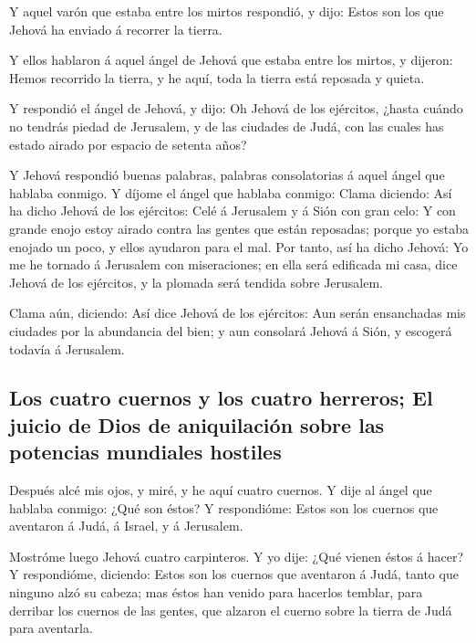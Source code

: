  Y aquel varón que estaba entre los mirtos respondió, y
dijo: Estos son los que Jehová ha enviado á recorrer la tierra.

 Y ellos hablaron á aquel ángel de Jehová que estaba entre
los mirtos, y dijeron: Hemos recorrido la tierra, y he aquí, toda la
tierra está reposada y quieta.

 Y respondió el ángel de Jehová, y dijo: Oh Jehová de los
ejércitos, ¿hasta cuándo no tendrás piedad de Jerusalem, y de las
ciudades de Judá, con las cuales has estado airado por espacio de
setenta años?

 Y Jehová respondió buenas palabras, palabras consolatorias
á aquel ángel que hablaba conmigo.  Y díjome el ángel que
hablaba conmigo: Clama diciendo: Así ha dicho Jehová de los ejércitos:
Celé á Jerusalem y á Sión con gran celo:  Y con grande
enojo estoy airado contra las gentes que están reposadas; porque yo
estaba enojado un poco, y ellos ayudaron para el mal.  Por
tanto, así ha dicho Jehová: Yo me he tornado á Jerusalem con
miseraciones; en ella será edificada mi casa, dice Jehová de los
ejércitos, y la plomada será tendida sobre Jerusalem.

 Clama aún, diciendo: Así dice Jehová de los ejércitos: Aun
serán ensanchadas mis ciudades por la abundancia del bien; y aun
consolará Jehová á Sión, y escogerá todavía á Jerusalem.

\hypertarget{los-cuatro-cuernos-y-los-cuatro-herreros-el-juicio-de-dios-de-aniquilaciuxf3n-sobre-las-potencias-mundiales-hostiles}{%
\subsection{Los cuatro cuernos y los cuatro herreros; El juicio de Dios
de aniquilación sobre las potencias mundiales
hostiles}\label{los-cuatro-cuernos-y-los-cuatro-herreros-el-juicio-de-dios-de-aniquilaciuxf3n-sobre-las-potencias-mundiales-hostiles}}

 Después alcé mis ojos, y miré, y he aquí cuatro cuernos.
 Y dije al ángel que hablaba conmigo: ¿Qué son éstos? Y
respondióme: Estos son los cuernos que aventaron á Judá, á Israel, y á
Jerusalem.

 Mostróme luego Jehová cuatro carpinteros.  Y
yo dije: ¿Qué vienen éstos á hacer? Y respondióme, diciendo: Estos son
los cuernos que aventaron á Judá, tanto que ninguno alzó su cabeza; mas
éstos han venido para hacerlos temblar, para derribar los cuernos de las
gentes, que alzaron el cuerno sobre la tierra de Judá para aventarla.

